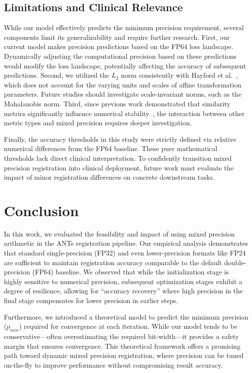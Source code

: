 \documentclass[journal,twoside,web]{ieeecolor}
\begin{document}
\subsection{Limitations and Clinical Relevance}
While our model effectively predicts the minimum precision requirement, several components limit its generalizability and require further research. First, our current model makes precision predictions based on the FP64 loss landscape. Dynamically adjusting the computational precision based on these predictions would modify the loss landscape, potentially affecting the accuracy of subsequent predictions. Second, we utilized the $L_2$ norm consistently with Hayford et al.~\cite{Hayford2024-kb}, which does not account for the varying units and scales of affine transformation parameters. Future studies should investigate scale-invariant norms, such as the Mahalanobis norm. Third, since previous work demonstrated that similarity metrics significantly influence numerical stability~\cite{Mirhakimi2025-qb}, the interaction between other metric types and mixed precision requires deeper investigation.

Finally, the accuracy thresholds in this study were strictly defined via relative numerical differences from the FP64 baseline. These pure mathematical thresholds lack direct clinical interpretation. To confidently transition mixed precision registration into clinical deployment, future work must evaluate the impact of minor registration differences on concrete downstream tasks.

\section{Conclusion}
\label{sec:conclusion}
In this work, we evaluated the feasibility and impact of using mixed precision arithmetic in the ANTs registration pipeline. Our empirical analysis demonstrates that standard single-precision (FP32) and even lower-precision formats like FP24 are sufficient to maintain registration accuracy comparable to the default double-precision (FP64) baseline. We observed that while the initialization stage is highly sensitive to numerical precision, subsequent optimization stages exhibit a degree of resilience, allowing for ``accuracy recovery'' where high precision in the final stage compensates for lower precision in earlier steps.

Furthermore, we introduced a theoretical model to predict the minimum precision ($p_{min}$) required for convergence at each iteration. While our model tends to be conservative---often overestimating the required bit-width---it provides a safety margin that ensures convergence. This theoretical framework offers a promising path toward dynamic mixed precision registration, where precision can be tuned on-the-fly to improve performance without compromising result accuracy.
\end{document}
